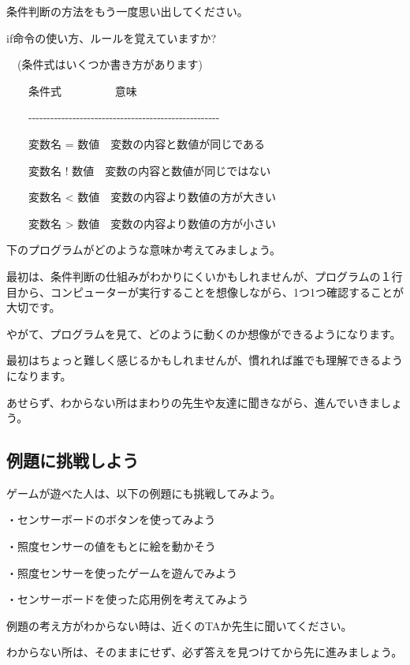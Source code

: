 
条件判断の方法をもう一度思い出してください。

if命令の使い方、ルールを覚えていますか?

\begin{description}
    \item {}
    \item {}
    \item {}
    \item {}
\end{description}

\ \ (条件式はいくつか書き方があります)


\ \ \ \ 条件式 \ \ \ \ \ \ \ \ \ 意味

\ \ \ \ {}-{}-{}-{}-{}-{}-{}-{}-{}-{}-{}-{}-{}-{}-{}-{}-{}-{}-{}-{}-{}-{}-{}-{}-{}-{}-{}-{}-{}-{}-{}-{}-{}-{}-{}-{}-{}-{}-{}-{}-{}-{}-{}-{}-{}-{}-{}-{}-{}-{}-{}-{}-

\ \ \ \ 変数名 =
数値\ \ 変数の内容と数値が同じである

\ \ \ \ 変数名 !
数値\ \ 変数の内容と数値が同じではない

\ \ \ \ 変数名 {\textless}
数値\ \ 変数の内容より数値の方が大きい

\ \ \ \ 変数名 {\textgreater}
数値\ \ 変数の内容より数値の方が小さい

下のプログラムがどのような意味か考えてみましょう。


\begin{description}
    \item {}
    \item {}
\end{description}

最初は、条件判断の仕組みがわかりにくいかもしれませんが、プログラムの１行目から、コンピューターが実行することを想像しながら、1つ1つ確認することが大切です。

やがて、プログラムを見て、どのように動くのか想像ができるようになります。

最初はちょっと難しく感じるかもしれませんが、慣れれば誰でも理解できるようになります。

あせらず、わからない所はまわりの先生や友達に聞きながら、進んでいきましょう。

\subsection{例題に挑戦しよう}

ゲームが遊べた人は、以下の例題にも挑戦してみよう。

・センサーボードのボタンを使ってみよう

・照度センサーの値をもとに絵を動かそう

・照度センサーを使ったゲームを遊んでみよう

・センサーボードを使った応用例を考えてみよう


例題の考え方がわからない時は、近くのTAか先生に聞いてください。

わからない所は、そのままにせず、必ず答えを見つけてから先に進みましょう。

